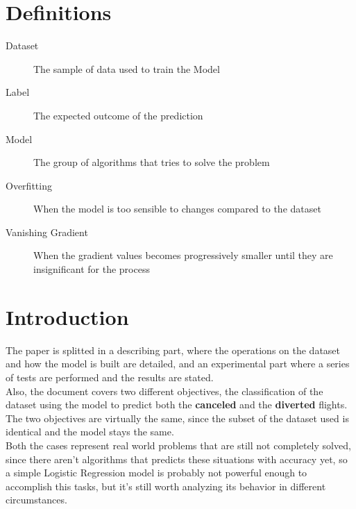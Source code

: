 \documentclass[
	letterpaper, %
	10pt, %
]{class}
\begin{document}
\section{Definitions}\label{definitions} %

\begin{description}
    \item[Dataset] The sample of data used to train the Model
    \item[Label] The expected outcome of the prediction
    \item[Model] The group of algorithms that tries to solve the problem
    \item[Overfitting] When the model is too sensible to changes compared to the dataset
    \item[Vanishing Gradient] When the gradient values becomes progressively smaller until they are insignificant for the process
\end{description}


\section{Introduction}

The paper is splitted in a describing part, where the operations on the dataset and how the model is built are detailed, and an experimental part where a series of tests are performed and the results are stated.\\

Also, the document covers two different objectives, the classification of the dataset using the model to predict both the \textbf{canceled} and the \textbf{diverted} flights.\\
The two objectives are virtually the same, since the subset of the dataset used is identical and the model stays the same.\\

Both the cases represent real world problems that are still not completely solved, since there aren't algorithms that predicts these situations with accuracy yet, so a simple Logistic Regression model is probably not powerful enough to accomplish this tasks, but it's still worth analyzing its behavior in different circumstances.
\end{document}
